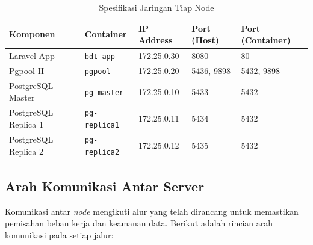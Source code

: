 \begin{table}[H]
\centering
\caption{Spesifikasi Jaringan Tiap Node}
\label{tab:network}
\begin{tabularx}{\textwidth}{l l l l l}
\toprule
\textbf{Komponen} & \textbf{Container} & \textbf{IP Address} &
\textbf{Port (Host)} & \textbf{Port (Container)} \\
\midrule
Laravel App   & \texttt{bdt-app}     & 172.25.0.30 & 8080       & 80 \\
Pgpool-II     & \texttt{pgpool}      & 172.25.0.20 & 5436, 9898 & 5432, 9898 \\
PostgreSQL Master  & \texttt{pg-master}   & 172.25.0.10 & 5433       & 5432 \\
PostgreSQL Replica 1 & \texttt{pg-replica1} & 172.25.0.11 & 5434    & 5432 \\
PostgreSQL Replica 2 & \texttt{pg-replica2} & 172.25.0.12 & 5435    & 5432 \\
\bottomrule
\end{tabularx}
\end{table}

\subsection{Arah Komunikasi Antar Server}

Komunikasi antar \textit{node} mengikuti alur yang telah dirancang
untuk memastikan pemisahan beban kerja dan keamanan data. Berikut
adalah rincian arah komunikasi pada setiap jalur:


